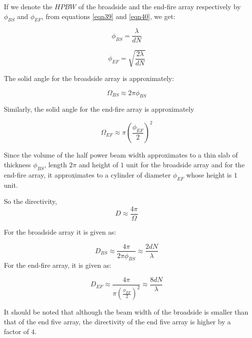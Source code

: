 If we denote the $HPBW$ of the broadside and the end-fire array respectively by $\phi_{BS}$ and $\phi_{EF}$, from equations \ref{eqn39} and \ref{eqn40}, we get:

$$
\phi_{BS} = \frac{\lambda}{dN}
$$

$$
\phi_{EF} = \sqrt{\frac{2 \lambda}{dN}}
$$

The solid angle for the broadside array is approximately:

$$
\Omega_{BS} \approx 2 \pi \phi_{BS}
$$

Similarly, the solid angle for the end-fire array is approximately

$$
\Omega_{EF} \approx  \pi (\frac{\phi_{EF}}{2})^2
$$

Since the volume of the half power beam width approximates to a thin slab of thickness $\phi_{BS}$, length $2\pi$ and height of $1$ unit for the broadside array and for the end-fire array, it approximates to a cylinder of diameter $\phi_{EF}$ whose height is $1$ unit.

So the directivity,
$$
D \approx \frac{4 \pi}{\Omega}
$$

For the broadside array it is given as:

\begin{equation}
D_{BS} \approx \frac{4 \pi}{2\pi\phi_{BS}} \approx \frac{2dN}{\lambda}
\end{equation}
For the end-fire array, it is given as:

\begin{equation}
D_{EF} \approx \frac{4 \pi}{\pi (\frac{\phi_{EF}}{2})^2} \approx \frac{8dN}{\lambda}
\end{equation}

It should be noted that although the beam width of the broadside
is smaller than that of the end five array, the directivity of the end five array is higher by a factor of $4$. 

